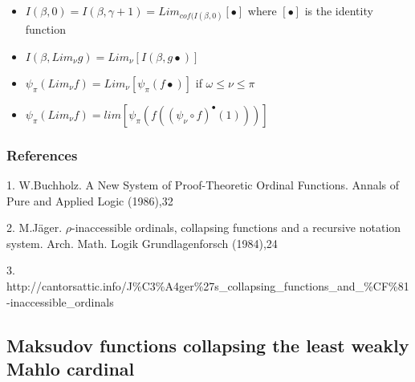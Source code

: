 \documentclass[10pt]{article}
\begin{document}
\begin{itemize}
\bigskip

\item \( I(\beta,0) = I(\beta,\gamma+1) = Lim_{cof(I(\beta,0)} [\bullet] \) where \( [\bullet] \) is the identity function
\item \( I(\beta,Lim_\nu g) = Lim_\nu [I(\beta,g \bullet)] \)
\item \( \psi_\pi(Lim_\nu f) = Lim_\nu [\psi_\pi(f \bullet)] \) if \( \omega \le \nu \le \pi \)
\begin{comment}
\item \( \psi_\pi(Lim_\nu f) = lim [\psi_\pi(f (g \bullet)] \) with \( g(0) = 1 \) and \( g (n+1) = \psi_\nu(f(g(n))) \) if \( \nu \ge \pi \)
\end{comment}
\item \( \psi_\pi(Lim_\nu f) = lim [ \psi_\pi(f((\psi_\nu \circ f)^\bullet(1)))] \)

\end{itemize}

\begin{comment}

\subsubsection{See also}

Other ordinal collapsing functions:

[[Madore's \(\psi\) function]]

[[Buchholz's \(\psi\) functions]]

[[User blog:Denis Maksudov/Ordinal functions collapsing the least weakly Mahlo cardinal; a system of fundamental sequences|collapsing functions based on a weakly Mahlo cardinal]]

\end{comment}

\subsubsection{References}

1. W.Buchholz. A New System of Proof-Theoretic Ordinal Functions. Annals of Pure and Applied Logic (1986),32

2. M.Jäger. \(\rho\)-inaccessible ordinals, collapsing functions and a recursive notation system. Arch. Math. Logik Grundlagenforsch (1984),24

3. http://cantorsattic.info/J\%C3\%A4ger\%27s\_collapsing\_functions\_and\_\%CF\%81-inaccessible\_ordinals


\subsection{Maksudov functions collapsing the least weakly Mahlo cardinal}
\end{document}

